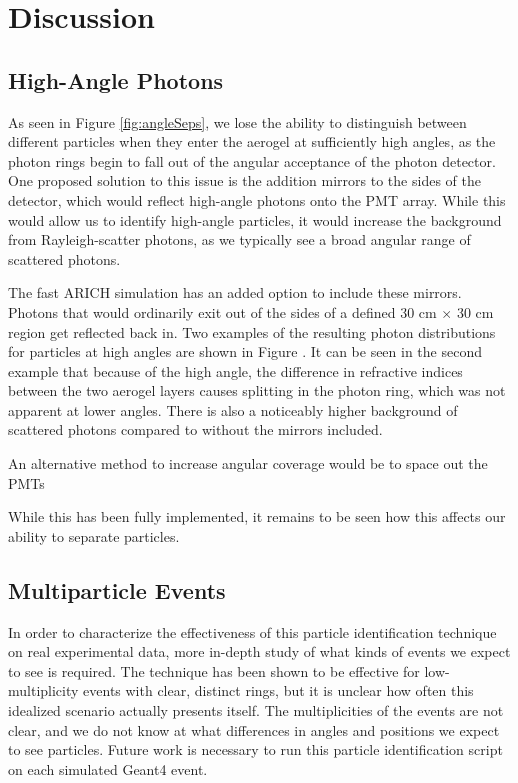 
\chapter{Discussion}
\label{ch:Discussion}


\section{High-Angle Photons}
As seen in Figure \ref{fig:angleSeps}, we lose the ability to distinguish between different particles when they enter the aerogel at sufficiently high angles, as the photon rings begin to fall out of the angular acceptance of the photon detector.
One proposed solution to this issue is the addition mirrors to the sides of the detector, which would reflect high-angle photons onto the PMT array. 
While this would allow us to identify high-angle particles, it would increase the background from Rayleigh-scatter photons, as we typically see a broad angular range of scattered photons.

The fast ARICH simulation has an added option to include these mirrors.
Photons that would ordinarily exit out of the sides of a defined 30 cm $\times$ 30 cm region get reflected back in.
Two examples of the resulting photon distributions for particles at high angles are shown in Figure .
It can be seen in the second example that because of the high angle, the difference in refractive indices between the two aerogel layers causes splitting in the photon ring, which was not apparent at lower angles.
There is also a noticeably higher background of scattered photons compared to without the mirrors included.

An alternative method to increase angular coverage would be to space out the PMTs

While this has been fully implemented, it remains to be seen how this affects our ability to separate particles. 


\section{Multiparticle Events}
In order to characterize the effectiveness of this particle identification technique on real experimental data,  more in-depth study of what kinds of events we expect to see is required. 
The technique has been shown to be effective for low-multiplicity events with clear, distinct rings, but it is unclear how often this idealized scenario actually presents itself.
The multiplicities of the events are not clear, and we do not know at what differences in angles and positions we expect to see particles.
Future work is necessary to run this particle identification script on each simulated Geant4 event.

